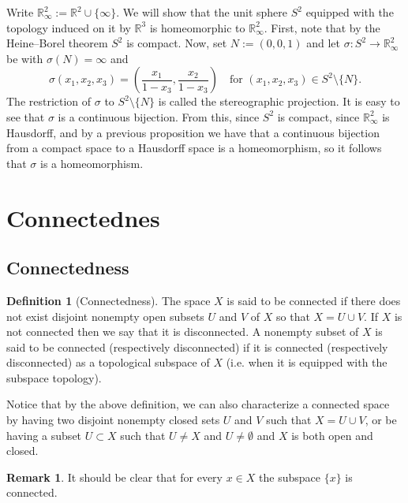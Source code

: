\documentclass[11pt,a4paper]{article}
\theoremstyle{definition}
\newtheorem{definition}{Definition}[section]
\newtheorem{remark}{Remark}[section]
\theoremstyle{plain}
\newcommand{\R}{\mathbb{R}}
\begin{document}
  Write $\R^2_\infty := \R^2 \cup \{\infty\}$.
  We will show that the unit sphere $S^2$ equipped with the topology
  induced on it by $\R^3$ is homeomorphic to $\R^2_\infty$.
  First, note that by the Heine--Borel theorem $S^2$ is compact.
  Now, set $N := (0,0,1)$ and let $\sigma \colon S^2 \to \R^2_\infty$ be
  with $\sigma(N) = \infty$ and
  \[
    \sigma(x_1,x_2,x_3) =
    \left(\frac{x_1}{1 - x_3}, \frac{x_2}{1 - x_3}\right) \quad
    \text{for $(x_1,x_2,x_3) \in S^2 \setminus \{N\}$}.
  \]
  The restriction of $\sigma$ to $S^2 \setminus \{N\}$ is called the
  stereographic projection.
  It is easy to see that $\sigma$ is a continuous bijection.
  From this, since $S^2$ is compact,
  since $\R^2_\infty$ is Hausdorff,
  and by a previous proposition we have that a continuous bijection from
  a compact space to a Hausdorff space is a homeomorphism,
  so it follows that $\sigma$ is a homeomorphism.

  \newpage

  \section{Connectednes}

  \subsection{Connectedness}

  \begin{definition}[Connectedness]
    The space $X$ is said to be connected if there does not exist disjoint
    nonempty open subsets $U$ and $V$ of $X$ so that $X = U \cup V$.
    If $X$ is not connected then we say that it is disconnected.
    A nonempty subset of $X$ is said to be connected 
    (respectively disconnected) if it is connected (respectively disconnected) 
    as a topological subspace of $X$
    (i.e. when it is equipped with the subspace topology).
  \end{definition}

  Notice that by the above definition, we can also characterize a connected
  space by having two disjoint nonempty closed sets $U$ and $V$ such that
  $X = U \cup V$, or be having a subset $U \subset X$ such that $U \neq X$
  and $U \neq \emptyset$ and $X$ is both open and closed.

  \begin{remark}
    It should be clear that for every $x \in X$ the subspace $\{x\}$ is
    connected.
  \end{remark}
\end{document}
